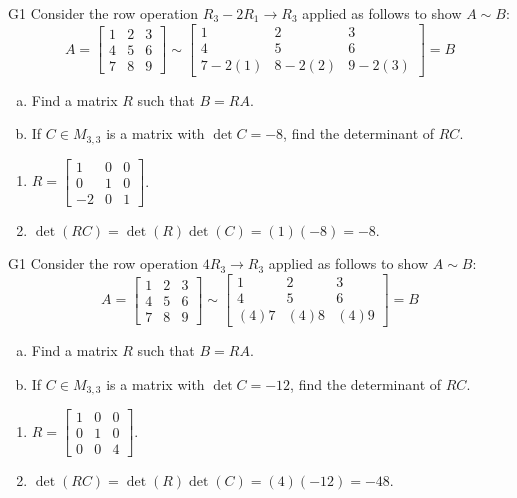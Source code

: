\begin{problem}{G1}
Consider the row operation \(R_3-2R_1\to R_3\) applied as follows to show
\(A\sim B\):
\[
A=\begin{bmatrix}1&2&3\\4&5&6\\7&8&9\end{bmatrix}
  \sim
\begin{bmatrix}1&2&3\\4&5&6\\7-2(1)&8-2(2)&9-2(3)\end{bmatrix}=B
\]
\begin{enumerate}[(a)]
\item Find a matrix \(R\) such that \(B=RA\).
\item If \(C \in M_{3,3}\) is a matrix with \(\det C = -8\), find the determinant of \(RC\).
\end{enumerate}
\end{problem}
\begin{solution}
\begin{enumerate}
\item \(R= \begin{bmatrix} 1 & 0 & 0 \\ 0 & 1 & 0 \\ -2 & 0 & 1 \end{bmatrix}\).
\item \(\det(RC)= \det(R)\det(C)=(1)(-8)=-8\).
\end{enumerate}
\end{solution}

\begin{problem}{G1}
Consider the row operation \(4R_3\to R_3\) applied as follows to show
\(A\sim B\):
\[
A=\begin{bmatrix}1&2&3\\4&5&6\\7&8&9\end{bmatrix}
  \sim
\begin{bmatrix}1&2&3\\4&5&6\\(4)7&(4)8&(4)9\end{bmatrix}=B
\]
\begin{enumerate}[(a)]
\item Find a matrix \(R\) such that \(B=RA\).
\item If \(C \in M_{3,3}\) is a matrix with \(\det C = -12\), find the determinant of \(RC\).
\end{enumerate}
\end{problem}
\begin{solution}
\begin{enumerate}
\item \(R= \begin{bmatrix} 1 & 0 & 0 \\ 0 & 1 & 0 \\ 0 & 0 & 4 \end{bmatrix}\).
\item \(\det(RC)= \det(R)\det(C)=(4)(-12)=-48\).
\end{enumerate}
\end{solution}

